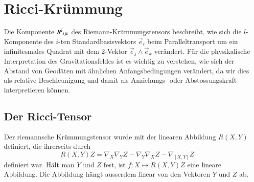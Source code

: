 %
%
\section{Ricci-Krümmung
\label{buch:kruemmung:section:ricci}}

Die Komponente $R^l\mathstrut_{ijk}$ des Riemann-Krümmungstensors
beschreibt, wie sich die $l$-Kom\-po\-nen\-te des $i$-ten 
Standardbasisvektors $\vec{e}_i$ beim Paralleltransport um
ein infinitesmales Quadrat mit dem 2-Vektor $\vec{e}_j\wedge \vec{e}_k$
verändert.
Für die physikalische Interpretation des Gravitationsfeldes ist
es wichtig zu verstehen, wie sich der Abstand von Geodäten mit
ähnlichen Anfangsbedingungen verändert, da wir dies als relative
Beschleunigung und damit als Anziehungs- oder Abstossungskraft 
interpretieren können.

%
%
\subsection{Der Ricci-Tensor}
Der riemannsche Krümmungstensor wurde mit der linearen Abbildung
$R(X,Y)$ definiert, die ihrerseits durch
\[
R(X,Y)Z
=
\nabla_X\nabla_YZ - \nabla_Y\nabla_XZ-\nabla_{[X,Y]}Z
\]
definiert war.
Hält man $Y$ und $Z$ fest, ist $f:X\mapsto R(X,Y)Z$ eine lineare Abbildung.
Die Abbildung hängt ausserdem linear von den Vektoren $Y$ und $Z$ ab.

